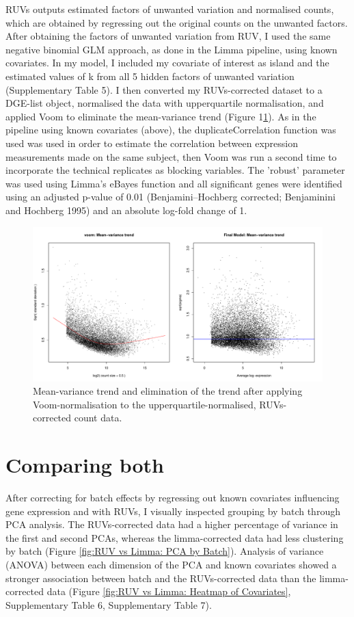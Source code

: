 \documentclass[12pt,a4paper,titlepage,twoside,openright]{book}
\begin{document}
\begin{mainmatter}
RUVs outputs estimated factors of unwanted variation and normalised counts, which are obtained by regressing out the original counts on the unwanted factors. After obtaining the factors of unwanted variation from RUV, I used the same negative binomial GLM approach, as done in the Limma pipeline, using known covariates. In my model, I included my covariate of interest as island and the estimated values of k from all 5 hidden factors of unwanted variation (Supplementary Table 5). I then converted my RUVs-corrected dataset to a DGE-list object, normalised the data with upperquartile normalisation, and applied Voom to eliminate the mean-variance trend (﻿Figure 1\ref{fig:Voom normalisation RUV}). As in the pipeline using known covariates (above), the duplicateCorrelation function was used was used in order to estimate the correlation between expression measurements made on the same subject, then Voom was run a second time to incorporate the technical replicates as blocking variables. The 'robust' parameter was used using Limma's eBayes function and all significant genes were identified using an adjusted p-value of 0.01 (Benjamini–Hochberg corrected; Benjaminini and Hochberg 1995) and an absolute log-fold change of 1. 

\begin{figure}[htb!]
\centering
\includegraphics[width=\textwidth,height=\textheight,keepaspectratio]{Limma_voom_upperquartilenormalisation.pdf}
\caption{Mean-variance trend and elimination of the trend after applying Voom-normalisation to the upperquartile-normalised, RUVs-corrected count data.}
\label{fig:Voom normalisation RUV}
\end{figure}


\section{Comparing both}
After correcting for batch effects by regressing out known covariates influencing gene expression and with RUVs, I visually inspected grouping by batch through PCA analysis. The RUVs-corrected data had a higher percentage of variance in the first and second PCAs, whereas the limma-corrected data had less clustering by batch (﻿Figure \ref{fig:RUV vs Limma: PCA by Batch}). Analysis of variance (ANOVA) between each dimension of the PCA and known covariates showed a stronger association between batch and the RUVs-corrected data than the limma-corrected data (﻿Figure \ref{fig:RUV vs Limma: Heatmap of Covariates}﻿, Supplementary Table 6, Supplementary Table 7). 


\end{mainmatter}
\end{document}
